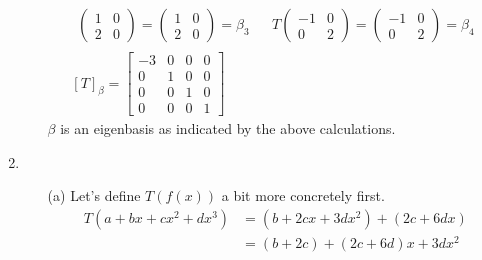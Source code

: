 \documentclass[12pt]{article}
\begin{document}
\begin{enumerate}
\begin{enumerate}
\begin{gather*}
\begin{aligned}
\begin{pmatrix}
                                              1 & 0 \\
                                              2 & 0
                                        \end{pmatrix}=\begin{pmatrix}
                                                            1 & 0 \\
                                                            2 & 0
                                                      \end{pmatrix}=\beta_3 &  &
                                    T\begin{pmatrix}
                                           -1 & 0 \\
                                           0  & 2
                                     \end{pmatrix}=\begin{pmatrix}
                                                         -1 & 0 \\
                                                         0  & 2
                                                   \end{pmatrix}=\beta_4
                              \end{aligned} \\
                              [T]_\beta=\begin{bmatrix}
                                    -3 & 0 & 0 & 0 \\
                                    0  & 1 & 0 & 0 \\
                                    0  & 0 & 1 & 0 \\
                                    0  & 0 & 0 & 1
                              \end{bmatrix}
                        \end{gather*}
                        $\beta$ is an eigenbasis as indicated by the above calculations.
            \end{enumerate}
      \item \begin{enumerate}
                  \item[(a)] Let's define $T(f(x))$ a bit more concretely first.
                        \begin{align*}
                              T\left(a+bx+cx^2+dx^3\right) & = \left(b+2cx+3dx^2\right)+\left(2c+6dx\right) \\
                                                           & = (b+2c)+(2c+6d)x+3dx^2

\end{align*}
\end{enumerate}
\end{enumerate}
\end{document}
